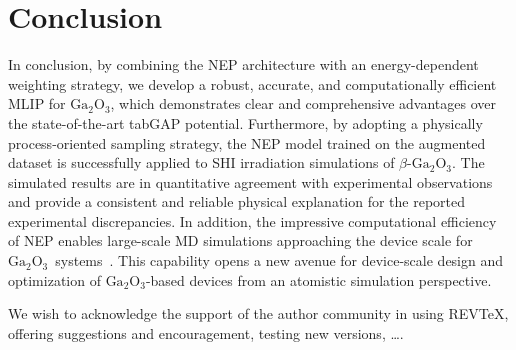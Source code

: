 \documentclass[%
reprint,
superscriptaddress,
 amsmath,amssymb,
 aps,
]{revtex4-2}
\newcommand{\ga}{$\text{Ga}_2\text{O}_3$}
\begin{document}
\section{Conclusion}

In conclusion, by combining the NEP architecture with an energy-dependent weighting
strategy, we develop a robust, accurate, and computationally efficient MLIP for \ga,
which demonstrates clear and comprehensive advantages over the state-of-the-art tabGAP
potential.
Furthermore, by adopting a physically process-oriented sampling strategy, the NEP model
trained on the augmented dataset is successfully applied to SHI irradiation simulations
of $\beta$-\ga.
The simulated results are in quantitative agreement with experimental observations and
provide a consistent and reliable physical explanation for the reported experimental
discrepancies.
In addition, the impressive computational efficiency of NEP enables large-scale MD
simulations approaching the device scale for \ga\ systems~\cite{xu_device-scale_2025}.
This capability opens a new avenue for device-scale design and optimization of
\ga-based devices from an atomistic simulation perspective.

\begin{acknowledgments}
We wish to acknowledge the support of the author community in using
REV\TeX{}, offering suggestions and encouragement, testing new versions,
\dots.
\end{acknowledgments}

\appendix
\end{document}
